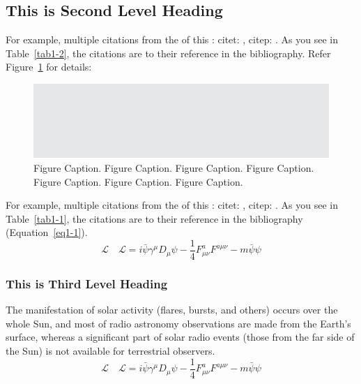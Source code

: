 \lipsum[1-2]

\subsection{This is Second Level Heading}

\lipsum[3]

For example, multiple citations from the  of this :
citet: \citet{CR7,CR8}, citep: \citep{CR9,CR6}.
As you see in Table~\ref{tab1-2}, the citations are  to their
reference in the bibliography. Refer Figure~\ref{fig1-1} for details:

\begin{figure}
\includegraphics{01.eps}
\caption{Figure Caption. Figure Caption.
Figure Caption. Figure Caption. Figure Caption. 
Figure Caption. Figure Caption.
\label{fig1-1}}
\end{figure}

For example, multiple citations from the  of this :
citet: \citet{CR9,CR6}, citep: \citep{CR9,CR6}.
As you see in Table~\ref{tab1-1}, the citations are  to their
reference in the bibliography (Equation~\ref{eq1-1}).
\begin{equation}
\mathcal{L}\quad \mathbf{\mathcal{L}} = i \bar{\psi} \gamma^\mu D_\mu \psi - 
\frac{1}{4} F_{\mu\nu}^a F^{a\mu\nu} - m \bar{\psi} \psi\label{eq1-1}
\end{equation}

\subsubsection{This is Third Level Heading}

The manifestation of solar activity (flares, bursts, and others) occurs over the whole Sun, and most of radio astronomy observations are made from the Earth's surface, whereas a significant part of solar radio events (those from the far side of the Sun) is not available for terrestrial observers.
\begin{equation}
\mathcal{L}\quad \mathbf{\mathcal{L}} = i \bar{\psi} \gamma^\mu D_\mu \psi - 
\frac{1}{4} F_{\mu\nu}^a F^{a\mu\nu} - m \bar{\psi} \psi\label{eq1-2}
\end{equation}

